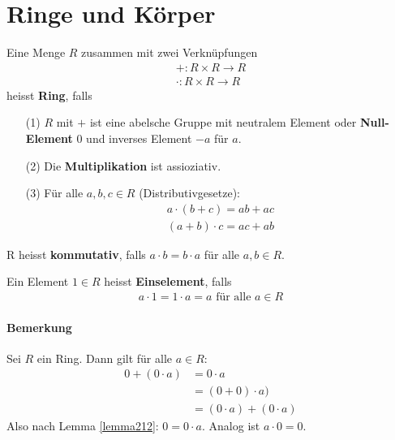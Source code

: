 \documentclass[11pt]{report}
\newcommand*\f[1] {\textbf{#1}}
\begin{document}
\section{Ringe und Körper}
Eine Menge $R$ zusammen mit zwei Verknüpfungen
\begin{align}
 + : R \times R \rightarrow R\\
 \cdot : R \times R \rightarrow R
\end{align}
heisst \f{Ring}, falls
\begin{itemize}
 \item [(1)] $R$ mit $+$ ist eine abelsche Gruppe mit neutralem Element oder \f{Null-Element} 0 und inverses Element $-a$ für $a$.
 \item [(2)] Die \f{Multiplikation} ist assioziativ.
 \item [(3)] Für alle $a, b, c \in R$ (Distributivgesetze):
\begin{align}
  a\cdot (b + c) = ab + ac \\
  (a+b)\cdot c = ac + ab
\end{align}
\end{itemize}
R heisst \f{kommutativ}, falls $a\cdot b = b \cdot a$ für alle $a, b \in R$.

Ein Element $1 \in R$ heisst \f{Einselement}, falls
\begin{align}
 a \cdot 1 = 1 \cdot a = a \textrm{ für alle } a\in R
\end{align}

\paragraph{Bemerkung} Sei $R$ ein Ring. Dann gilt für alle $a \in R$:
\begin{align}
 0 + (0\cdot a) &= 0 \cdot a \\
                &= (0 + 0) \cdot a) \\
                &= (0 \cdot a) + (0 \cdot a)
\end{align}
Also nach Lemma \ref{lemma212}: $0=0\cdot a$. Analog ist $a\cdot 0=0$.
\end{document}
